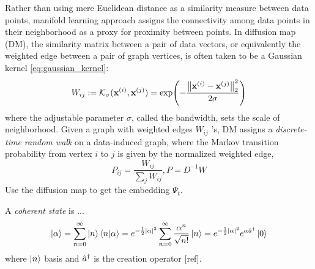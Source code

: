 Rather than using mere Euclidean distance as a similarity measure between data points, manifold learning approach assigns the connectivity among data points in their neighborhood as a proxy for proximity between points.
In diffusion map (DM), the similarity matrix between a pair of data vectors, or equivalently the weighted edge between a pair of graph vertices, is often taken to be a Gaussian kernel \cref{eq:gaussian_kernel}:
\begin{equation}
	W_{ij}:=\mathcal{K}_{\sigma}(\vb{x}^{(i)},\vb{x}^{(j)}) =
	\exp(-\frac{\norm{\vb{x}^{(i)}-\vb{x}^{(j)}}_2^2}{2\sigma})
\end{equation}
where the adjustable parameter $\sigma$, called the bandwidth, sets the scale of neighborhood.
Given a graph with weighted edges $W_{ij}$ ’s, DM assigns a \emph{discrete-time random walk} on a data-induced graph, 
where the Markov transition probability from vertex $i$ to $j$ is given by the normalized weighted edge,
\begin{equation}
	P_{ij} = \frac{W_{ij}}{\sum_{j}W_{ij}}
	,
	P = D^{-1} W
\end{equation}
Use the diffusion map to get the embedding $\Psi_t$.
\begin{definition}\label{def:coherent_state}
	A \emph{coherent state} is ...
	\begin{equation}
		\ket{\alpha} 
		= \sum_{n=0}^{\infty} \ket{n} \braket{n}{\alpha}
		= e^{-\frac{1}{2}\abs{\alpha}^2} \sum_{n=0}^{\infty} \frac{\alpha^n}{\sqrt{n!}} \ket{n} 
		= e^{-\frac{1}{2}\abs{\alpha}^2} e^{\alpha\hat{a}^\dagger}\ket{0} 
	\end{equation}
	where $\ket{n}$ basis and $\hat{a}^\dagger$ is the creation operator [ref].
\end{definition}
